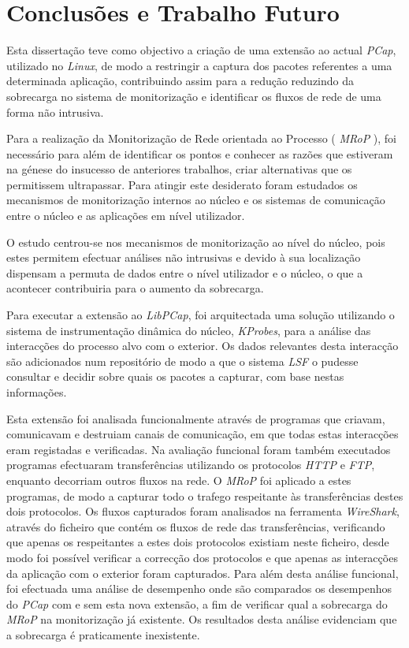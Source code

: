 \chapter{Conclusões e Trabalho Futuro}
\label{cap:conclusao}

Esta dissertação teve como objectivo a criação de uma extensão ao actual \textit{PCap}, utilizado no \textit{Linux}, de modo a restringir a captura dos pacotes referentes a uma determinada aplicação, contribuindo assim para a redução reduzindo da sobrecarga no sistema de monitorização e identificar os fluxos de rede de uma forma não intrusiva.

Para a realização da Monitorização de Rede orientada ao Processo ( \textit{MRoP} ), foi necessário para além de identificar os pontos e conhecer as razões que estiveram na génese do insucesso de anteriores trabalhos, criar alternativas que os permitissem ultrapassar.
Para atingir este desiderato foram estudados os mecanismos de monitorização internos ao núcleo e os sistemas de comunicação entre o núcleo e as aplicações em nível utilizador.

O estudo centrou-se nos mecanismos de monitorização ao nível do núcleo, pois estes permitem efectuar análises não intrusivas e devido à sua localização dispensam a permuta de dados entre o nível utilizador e o núcleo, o que a acontecer contribuiria para o aumento da sobrecarga.

Para executar a extensão ao \textit{LibPCap}, foi arquitectada uma solução utilizando o sistema de instrumentação dinâmica do núcleo, \textit{KProbes}, para a análise das interacções do processo alvo com o exterior.
Os dados relevantes desta interacção são adicionados num repositório de modo a que o sistema \textit{LSF} o pudesse consultar e decidir sobre quais os pacotes a capturar, com base nestas informações.

Esta extensão foi analisada funcionalmente através de programas que criavam, comunicavam e destruiam canais de comunicação, em que todas estas interacções eram registadas e verificadas.
Na avaliação funcional foram também executados programas efectuaram transferências utilizando os protocolos \textit{HTTP} e \textit{FTP}, enquanto decorriam outros fluxos na rede. 
O \textit{MRoP} foi aplicado a estes programas, de modo a capturar todo o trafego respeitante às transferências destes dois protocolos.
Os fluxos capturados foram analisados na ferramenta \textit{WireShark}, através do ficheiro que contém os fluxos de rede das transferências, verificando que apenas os respeitantes a estes dois protocolos existiam neste ficheiro, desde modo foi possível verificar a correcção dos protocolos e que apenas as interacções da aplicação com o exterior foram capturados.
Para além desta análise funcional, foi efectuada uma análise de desempenho onde são comparados os desempenhos do \textit{PCap} com e sem esta nova extensão, a fim de verificar qual a sobrecarga do \textit{MRoP} na monitorização já existente.
Os resultados desta análise evidenciam que a sobrecarga é praticamente inexistente.

